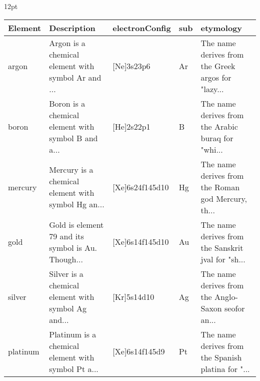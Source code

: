 \documentclass{arcticle}
\begin{document}
{12pt}
        \begin{table}
            \begin{tabular}{|p{1in}|p{2in}|p{0.5in}|p{1in}|p{2in}|}
                \toprule
                Element &                                        Description &  electronConfig & sub &                                          etymology \\
                \midrule
                argon & Argon is a chemical element with symbol Ar and ... &      [Ne]3s23p6 &  Ar & The name derives from the Greek argos for "lazy... \\
                boron & Boron is a chemical element with symbol B and a... &       [He]2s22p1 &   B & The name derives from the Arabic buraq for "whi... \\
                mercury & Mercury is a chemical element with symbol Hg an... & [Xe]6s24f145d10 &  Hg & The name derives from the Roman god Mercury, th... \\
                    gold & Gold is element 79 and its symbol is Au. Though... & [Xe]6s14f145d10 &  Au & The name derives from the Sanskrit jval for "sh... \\
                silver & Silver is a chemical element with symbol Ag and... &     [Kr]5s14d10 &  Ag & The name derives from the Anglo-Saxon seofor an... \\
                platinum & Platinum is a chemical element with symbol Pt a... &  [Xe]6s14f145d9 &  Pt & The name derives from the Spanish platina for "... \\
                \bottomrule
            \end{tabular}
        \end{table}
    
\end{document}
